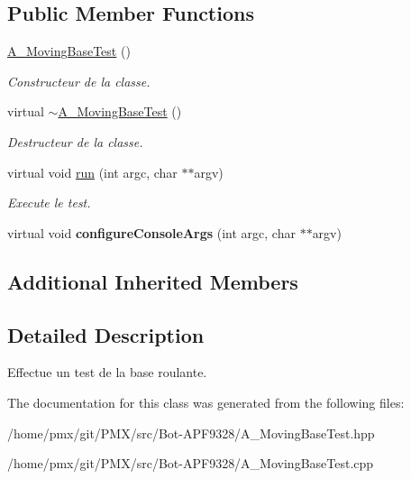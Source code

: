 \subsection*{Public Member Functions}
\begin{DoxyCompactItemize}
\item 
\mbox{\label{classA__MovingBaseTest_af173bfdd4bda95800779488657f79853}} 
\hyperlink{classA__MovingBaseTest_af173bfdd4bda95800779488657f79853}{A\+\_\+\+Moving\+Base\+Test} ()
\begin{DoxyCompactList}\small\item\em Constructeur de la classe. \end{DoxyCompactList}\item 
\mbox{\label{classA__MovingBaseTest_ac8178fe43c6603f82f45eb09b4e9a78c}} 
virtual \hyperlink{classA__MovingBaseTest_ac8178fe43c6603f82f45eb09b4e9a78c}{$\sim$\+A\+\_\+\+Moving\+Base\+Test} ()
\begin{DoxyCompactList}\small\item\em Destructeur de la classe. \end{DoxyCompactList}\item 
\mbox{\label{classA__MovingBaseTest_a1ac04e328db4ee50ebbd7cee6bfe39ca}} 
virtual void \hyperlink{classA__MovingBaseTest_a1ac04e328db4ee50ebbd7cee6bfe39ca}{run} (int argc, char $\ast$$\ast$argv)
\begin{DoxyCompactList}\small\item\em Execute le test. \end{DoxyCompactList}\item 
\mbox{\label{classA__MovingBaseTest_ac31ed8e8ea69e4429444aa9d80dbe194}} 
virtual void {\bfseries configure\+Console\+Args} (int argc, char $\ast$$\ast$argv)
\end{DoxyCompactItemize}
\subsection*{Additional Inherited Members}


\subsection{Detailed Description}
Effectue un test de la base roulante. 

The documentation for this class was generated from the following files\+:\begin{DoxyCompactItemize}
\item 
/home/pmx/git/\+P\+M\+X/src/\+Bot-\/\+A\+P\+F9328/A\+\_\+\+Moving\+Base\+Test.\+hpp\item 
/home/pmx/git/\+P\+M\+X/src/\+Bot-\/\+A\+P\+F9328/A\+\_\+\+Moving\+Base\+Test.\+cpp\end{DoxyCompactItemize}
